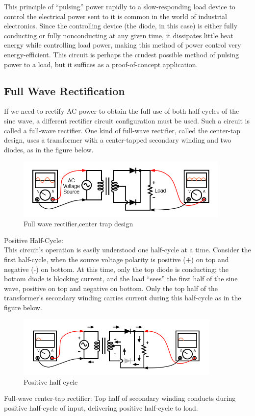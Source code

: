 \documentclass{article}
\begin{document}
This principle of “pulsing” power rapidly to a slow-responding load device to control the electrical power sent to it is common in the world of industrial electronics. Since the controlling device (the diode, in this case) is either fully conducting or fully nonconducting at any given time, it dissipates little heat energy while controlling load power, making this method of power control very energy-efficient. This circuit is perhaps the crudest possible method of pulsing power to a load, but it suffices as a proof-of-concept application.


	
	\subsection{Full Wave Rectification}
	
	If we need to rectify AC power to obtain the full use of both half-cycles of the sine wave, a different rectifier circuit configuration must be used. Such a circuit is called a full-wave rectifier. One kind of full-wave rectifier, called the center-tap design, uses a transformer with a center-tapped secondary winding and two diodes, as in the figure below.
	\begin{figure}[H]
		\centering
		\includegraphics[height=3cm]{full-waive-rectifier-center-tapped-design.jpg}
		\caption{Full wave rectifier,center trap design}
	\end{figure}
	{\large Positive Half-Cycle:}\\
This circuit’s operation is easily understood one half-cycle at a time. Consider the first half-cycle, when the source voltage polarity is positive (+) on top and negative (-) on bottom. At this time, only the top diode is conducting; the bottom diode is blocking current, and the load “sees” the first half of the sine wave, positive on top and negative on bottom. Only the top half of the transformer’s secondary winding carries current during this half-cycle as in the figure below.
	\begin{figure}[H]
		\centering
		\includegraphics[height=3cm]{full-wave-center-tap-rectifier-positive-half-cycle.jpg}
		\caption{Positive half cycle}
	\end{figure}
Full-wave center-tap rectifier: Top half of secondary winding conducts during positive half-cycle of input, delivering positive half-cycle to load.\\
\end{document}
